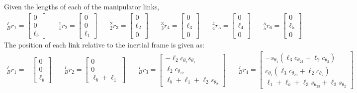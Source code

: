 \documentclass[12pt]{report}
\begin{document}
Given the lengths of each of the manipulator links,
\[
\begin{aligned}
  ^I_Br_1 = \begin{bmatrix} 0\\0\\ \ell_b\end{bmatrix} & \quad
  ^1_1r_2 = \begin{bmatrix} 0\\0\\ \ell_1\end{bmatrix} & \quad
  ^2_2r_3 = \begin{bmatrix} 0\\\ell_2\\ 0\end{bmatrix} & \quad
  ^3_3r_4 = \begin{bmatrix} 0\\\ell_3\\ 0\end{bmatrix} & \quad
  ^4_4r_5 = \begin{bmatrix} 0\\\ell_4\\ 0\end{bmatrix} & \quad
  ^5_5r_6 = \begin{bmatrix} 0\\\ell_5\\ 0\end{bmatrix} & \quad
\end{aligned}
\]
The position of each link relative to the inertial frame is given as:
\[
\begin{aligned}
  ^I_Br_1 =&
  \begin{bmatrix}
    0\\ 0\\ \ell_b
  \end{bmatrix} & \quad
  ^I_Br_2 =
  \begin{bmatrix}
    0\\ 0\\ \ell_b + \ell_1
  \end{bmatrix} & \quad
  ^I_Br_3 =
  \begin{bmatrix}
    -\ell_2c_{\theta_2}s_{\theta_1}\\
    \ell_2c_{\theta_{12}}\\
    \ell_b+\ell_1+\ell_2s_{\theta_2}
  \end{bmatrix} & \quad
  ^I_Br_4 =
  \begin{bmatrix}
    -s_{\theta_1}(\ell_3c_{\theta_{23}} + \ell_2c_{\theta_2}) \\
    c_{\theta_1}(\ell_3c_{\theta_{23}} + \ell_2c_{\theta_2}) \\
    \ell_1 + \ell_b + \ell_3s_{\theta_{23}} + \ell_2s_{\theta_2}
  \end{bmatrix} \\
\end{aligned}
  \]
\end{document}
